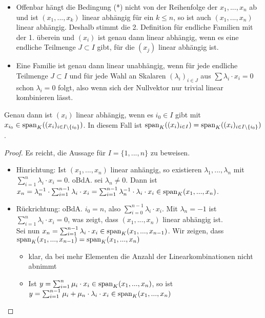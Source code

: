 \begin{remark}
	\begin{itemize}
		\item Offenbar hängt die Bedingung (*) nicht von der Reihenfolge der $x_1,...,x_n$ ab und ist $(x_1,...,x_k)$ linear 
		abhängig für ein $k \le n$, so ist auch $(x_1,...,x_n)$ linear abhängig. Deshalb stimmt die 2. Definition für 
		endliche Familien mit der 1. überein und $(x_i)$ ist genau dann linear abhängig, wenn es eine endliche Teilmenge 
		$J \subset I$ gibt, für die $(x_j)$ linear abhängig ist.
		\item Eine Familie ist genau dann linear unabhängig, wenn für jede endliche Teilmenge $J\subset I$ und für jede 
		Wahl an Skalaren $(\lambda_i)_{i\in J}$ aus $\sum \lambda_i\cdot x_i=0$ schon $\lambda_i=0$ folgt, also wenn sich 
		der Nullvektor nur trivial linear kombinieren lässt. 
	\end{itemize}
\end{remark}

\begin{proposition}
	Genau dann ist $(x_i)$ linear abhängig, wenn es $i_0 \in I$ gibt mit $x_{i_0} \in \operatorname{span}_K((x_i)_{i\in 
		I\backslash\{i_0\}})$. In diesem Fall ist $\operatorname{span}_K((x_i)_{i\in I})=\operatorname{span}_K((x_i)_{i\in I\backslash\{i_0\}})$.
\end{proposition}
\begin{proof}
	Es reicht, die Aussage für $I=\{1,...,n\}$ zu beweisen.
	\begin{itemize}
		\item Hinrichtung: Ist $(x_1,...,x_n)$ linear anhängig, so existieren $\lambda_1,...,\lambda_n$ mit $\sum_{i=1}^n 
		\lambda_i\cdot x_i=0$. oBdA. sei $\lambda_n\neq 0$. Dann ist $x_n=\lambda_n^{-1}\cdot\sum_{i=1}^{n-1} \lambda_i
		\cdot x_i=\sum_{i=1}^{n-1} \lambda_n^{-1}\cdot\lambda_i\cdot x_i \in \operatorname{span}_K(x_1,...,x_n)$.
		\item Rückrichtung: oBdA. $i_0=n$, also $\sum_{i=0}^{n-1} \lambda_i\cdot x_i$. Mit $\lambda_n=-1$ ist $\sum
		_{i=1}^n \lambda_i\cdot x_i=0$, was zeigt, dass $(x_1,...,x_n)$ linear abhängig ist. \\
		Sei nun $x_n=\sum_{i=1}^{n-1} \lambda_i\cdot x_i \in \operatorname{span}_K(x_1,...,x_{n-1})$. Wir zeigen, dass $\operatorname{span}_K(x_1,...,
		x_{n-1})=\operatorname{span}_K(x_1,...,x_n)$
		\begin{itemize}
			\item klar, da bei mehr Elementen die Anzahl der Linearkombinationen nicht abnimmt
			\item Ist $y=\sum_{i=1}^n \mu_i\cdot x_i \in \operatorname{span}_K(x_1,...,x_n)$, so ist $y=\sum_{i=1}^{n-1} \mu_i+
			\mu_n\cdot \lambda_i\cdot x_i \in \operatorname{span}_K(x_1,...,x_n)$
		\end{itemize}
	\end{itemize}
\end{proof}

